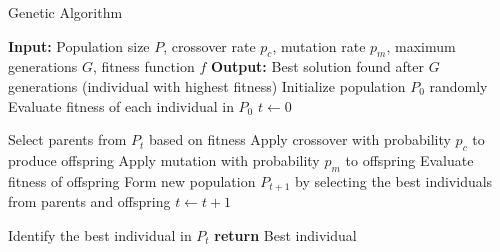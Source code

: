 \documentclass{article}[12pt]
\begin{document}
\begin{algorithm}[H]
\caption{Genetic Algorithm}
\begin{algorithmic}[1]
\State \textbf{Input:} Population size $P$, crossover rate $p_c$, mutation rate $p_m$, maximum generations $G$, fitness function $f$
\State \textbf{Output:} Best solution found after $G$ generations (individual with highest fitness)
\State Initialize population $P_0$ randomly
\State Evaluate fitness of each individual in $P_0$
\State $t \gets 0$

    \State Select parents from $P_t$ based on fitness
    \State Apply crossover with probability $p_c$ to produce offspring
    \State Apply mutation with probability $p_m$ to offspring
    \State Evaluate fitness of offspring
    \State Form new population $P_{t+1}$ by selecting the best individuals from parents and offspring
    \State $t \gets t + 1$
\EndWhile

\State Identify the best individual in $P_t$
\State \textbf{return} Best individual
\end{algorithmic}
\end{algorithm}


\end{document}
